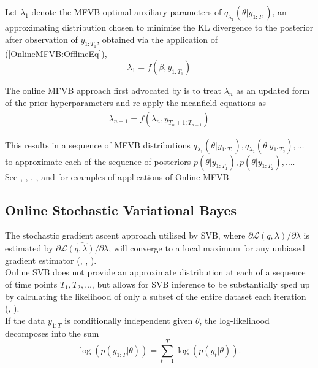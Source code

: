 \documentclass[12pt,a4paper]{article}\usepackage[]{graphicx}\usepackage[]{color}
\begin{document}
Let $\lambda_1$ denote the MFVB optimal auxiliary parameters of $q_{\lambda_1}(\theta | y_{1:T_1})$, an approximating distribution chosen to minimise the KL divergence to the posterior after observation of $y_{1:T_1}$, obtained via the application of (\ref{OnlineMFVB:OfflineEq}),
\begin{equation}
\lambda_1 = f(\beta, y_{1:T_1}) \label{OnlineMFVB:OnlineEq1}
\end{equation}

The online MFVB approach first advocated by \cite{Ghahramani2000b} is to treat $\lambda_n$ as an updated form of the prior hyperparameters and re-apply the meanfield equations as
\begin{align}
\lambda_{n+1} = f(\lambda_n, y_{T_n+1:T_{n+1}}) \label{OnlineMFVB:OnlineEq2}
\end{align}

This results in a sequence of MFVB distributions $q_{\lambda_1}(\theta | y_{1:T_1}), q_{\lambda_2}(\theta | y_{1:T_2}), \ldots$ to approximate each of the sequence of posteriors $p(\theta | y_{1:T_1}), p(\theta | y_{1:T_2}), \ldots$.
\\ 

See \cite{Smidl2004}, \cite{Hoffman2010}, \cite{Wang2011}, \cite{Broderick2013}, and \cite{Kabisa2016} for examples of applications of Online MFVB.

\subsection{Online Stochastic Variational Bayes}
\label{subsec:OnlineSVB}

The stochastic gradient ascent approach utilised by SVB, where $\partial\mathcal{L}(q, \lambda) / \partial \lambda$ is estimated by $\widehat{\partial\mathcal{L}(q, \lambda) / \partial \lambda}$, will converge to a local maximum for any unbiased gradient estimator (\cite{Robbins1951}, \cite{Bottou1999}, \cite{Bottou2008}).
\\

Online SVB does not provide an approximate distribution at each of a sequence of time points $T_1, T_2, \ldots$, but allows for SVB inference to be substantially sped up by calculating the likelihood of only a subset of the entire dataset each iteration (\cite{Hoffman2013}, \cite{Titsias2014}).
\\

If the data $y_{1:T}$ is conditionally independent given $\theta$, the log-likelihood decomposes into the sum
\begin{equation}
\label{OnlineSVB:likelihood}
\log(p(y_{1:T} | \theta)) = \sum_{t=1}^T \log(p(y_t | \theta)).
\end{equation}
\end{document}
